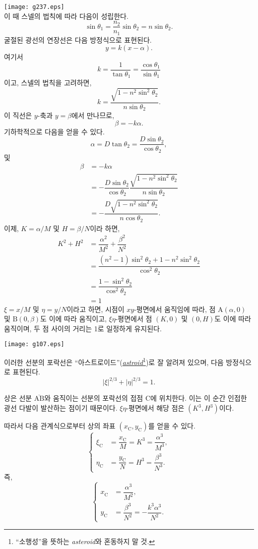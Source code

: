 \documentclass[twocolumn]{article}
\begin{document}
	\texttt{[image: g237.eps]}\\
	이 때 스넬의 법칙에 따라 다음이 성립한다.
	$$ \sin\theta_1 = \frac{n_2}{n_1} \sin\theta_2 = n\sin\theta_2.$$
	굴절된 광선의 연장선은 다음 방정식으로 표현된다.
	$$y=k(x-\alpha).$$
	여기서 
	$$k=\dfrac{1}{\tan\theta_1}=\dfrac{\cos\theta_1}{\sin\theta_1}$$
	이고, 스넬의 법칙을 고려하면,
	$$k=\dfrac{\sqrt{1-n^2\sin^2\theta_2}}{n\sin\theta_2}.$$
	이 직선은 $y$-축과 $y=\beta$에서 만나므로,
	$$\beta = -k\alpha.$$
	기하학적으로 다음을 얻을 수 있다.
	$$\alpha = D\tan\theta_2 = \dfrac{D\sin\theta_2}{\cos\theta_2},$$
	및
	$$\begin{aligned}
		\beta &= -k\alpha \\
		&= -\dfrac{D\sin\theta_2}{\cos\theta_2}
		\dfrac{\sqrt{1-n^2\sin^2\theta_2}}{n\sin\theta_2}\\
		&=-\dfrac{D\sqrt{1-n^2\sin^2\theta_2}}{n\cos\theta_2}.
	\end{aligned}$$
	이제, $K=\alpha/M$ 및 $H=\beta/N$이라 하면,
	$$ \begin{aligned}
		K^2 + H^2 &= \dfrac{\alpha^2}{M^2}+\dfrac{\beta^2}{N^2}\\
		&=\dfrac{\left(n^2-1\right)\sin^2\theta_2 + 1-n^2\sin^2\theta_2}
		{\cos^2\theta_2}\\
		&=\dfrac{1-\sin^2\theta_2}{\cos^2\theta_2}\\
		&=1
	\end{aligned}$$
	$\xi=x/M$ 및 $\eta=y/N$이라고 하면, 시점이 $xy$-평면에서 움직임에 따라,
	점 $\mathrm{A}(\alpha, 0)$ 및 $\mathrm{B}(0, \beta)$도 이에 따라 움직이고, 
	$\xi\eta$-평면에서 점 $(K, 0)$ 및 $(0, H)$도 이에 따라 움직이며, 
	두 점 사이의 거리는 1로 일정하게 유지된다.
	
	\texttt{[image: g107.eps]}
	
	이러한 선분의 포락선은 ``아스트로이드''(\href{https://en.wikipedia.org/wiki/Astroid}{\emph{astroid}}\footnote{
		``소행성''을 뜻하는 \emph{asteroid}와 혼동하지 말 것.})로 잘 알려져 있으며, 
	다음 방정식으로 표현된다.
	$$ \left| \xi \right|^{2/3} + \left| \eta \right|^{2/3} = 1. $$
	
	상은 선분 $\overline{\mathrm{AB}}$와 움직이는 선분의 포락선의 접점 $\mathrm{C}$에 위치한다. 
	이는 이 순간 인접한 광선 다발이 발산하는 점이기 때문이다. 
	$\xi\eta$-평면에서 해당 점은 $(K^3, H^3)$이다.
	
	따라서 다음 관계식으로부터 상의 좌표 $(x_{\mathrm{C}}^{}, y_{\mathrm{C}}^{})$를 얻을 수 있다.
	$$ \left\{ 
	\begin{aligned}
		\xi_{\mathrm{C}}^{} &= \dfrac{x_{\mathrm{C}}^{}}{M} = K^3 = \dfrac{\alpha^3}{M^3},\\
		\eta_{\mathrm{C}}^{} &= \dfrac{y_{\mathrm{C}}^{}}{N} = H^3 = \dfrac{\beta^3}{N^3}.
	\end{aligned}
	\right.$$
	즉,
	$$ \left\{ 
	\begin{aligned}
		x_{\mathrm{C}}^{} &= \dfrac{\alpha^3}{M^2},\\
		y_{\mathrm{C}}^{} &= \dfrac{\beta^3}{N^2}=-\dfrac{k^3\alpha^3}{N^2}.
	\end{aligned}
	\right.$$
	
\end{document}
